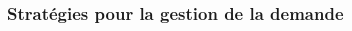 \documentclass[french]{beamer}
\begin{document}
{\begin{frame}
\frametitle{Stratégies pour la gestion de la demande}
\begin{columns}[T]
\begin{column}[T]{0.5\linewidth}
\begin{overlayarea}{0.95\linewidth}{2.8in}
\end{overlayarea}
\end{column}

\begin{column}[T]{0.5\linewidth}  %
\begin{overlayarea}{0.95\linewidth}{2.8in}
\end{overlayarea}
\end{column}
\end{columns}
\end{frame}


}
\end{document}
